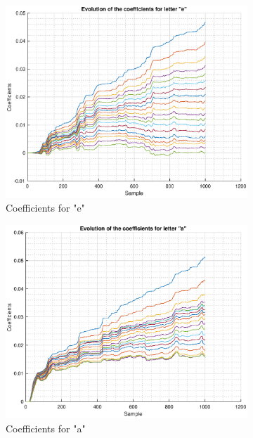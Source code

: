 \documentclass{article}
\begin{document}
\begin{figure}[h!]
\centering
\begin{subfigure}{0.24\textwidth}
\centering
\includegraphics[width = \textwidth]{speech_e}
\caption{Coefficients for "e"}
\label{fig:speech_e}
\end{subfigure}
\begin{subfigure}{0.24\textwidth}
\centering
\includegraphics[width = \textwidth]{speech_a}
\caption{Coefficients for "a"}
\label{fig:speech_a}
\end{subfigure}
\begin{subfigure}{0.24\textwidth}
\centering

\end{subfigure}
\end{figure}
\end{document}
